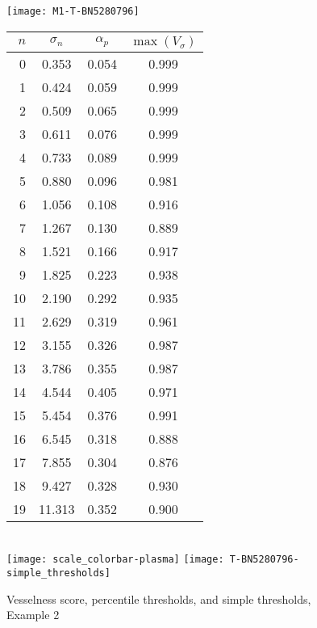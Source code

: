 \begin{figure}
  \begin{minipage}[tp]{0.5\textwidth}
    \texttt{[image: M1-T-BN5280796]}
  \end{minipage}
  \begin{minipage}[tp]{0.5\textwidth}
    \begin{tabular}{r|c|c|c}
      $n$  & $\sigma_n$  &  $\alpha_p$  &  $\max(V_\sigma)$ \\
      \hline
      0  &  0.353 &  0.054 &  0.999 \\
      1  &  0.424 &  0.059 &  0.999 \\
      2  &  0.509 &  0.065 &  0.999 \\
      3  &  0.611 &  0.076 &  0.999 \\
      4  &  0.733 &  0.089 &  0.999 \\
      5  &  0.880 &  0.096 &  0.981 \\
      6  &  1.056 &  0.108 &  0.916 \\
      7  &  1.267 &  0.130 &  0.889 \\
      8  &  1.521 &  0.166 &  0.917 \\
      9  &  1.825 &  0.223 &  0.938 \\
      10 &  2.190 &  0.292 &  0.935 \\
      11 &  2.629 &  0.319 &  0.961 \\
      12 &  3.155 &  0.326 &  0.987 \\
      13 &  3.786 &  0.355 &  0.987 \\
      14 &  4.544 &  0.405 &  0.971 \\
      15 &  5.454 &  0.376 &  0.991 \\
      16 &  6.545 &  0.318 &  0.888 \\
      17 &  7.855 &  0.304 &  0.876 \\
      18 &  9.427 &  0.328 &  0.930 \\
      19 & 11.313 &  0.352 &  0.900 \\
    \end{tabular} \\           
    \texttt{[image: scale\_colorbar-plasma]} \;
    \texttt{[image: T-BN5280796-simple\_thresholds]}
  \end{minipage}
  \caption{Vesselness score, percentile thresholds, and simple thresholds, Example 2}
  \label{fig:detailed_frangi_with_table_ex2}
\end{figure}


